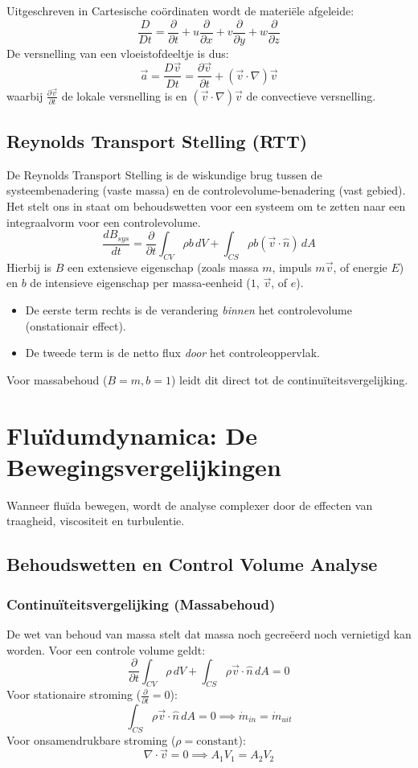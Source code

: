 \documentclass[a4paper,11pt,twoside]{report}
\begin{document}
Uitgeschreven in Cartesische coördinaten wordt de materiële afgeleide:
\[
\frac{D}{Dt} = \frac{\partial}{\partial t} + u \frac{\partial}{\partial x} + v \frac{\partial}{\partial y} + w \frac{\partial}{\partial z}
\]
De versnelling van een vloeistofdeeltje is dus:
\[
\vec{a} = \frac{D\vec{v}}{Dt} = \frac{\partial \vec{v}}{\partial t} + (\vec{v} \cdot \nabla)\vec{v}
\]
waarbij $\frac{\partial \vec{v}}{\partial t}$ de lokale versnelling is en $(\vec{v} \cdot \nabla)\vec{v}$ de convectieve versnelling.

\section{Reynolds Transport Stelling (RTT)}
De Reynolds Transport Stelling is de wiskundige brug tussen de systeembenadering (vaste massa) en de controlevolume-benadering (vast gebied). Het stelt ons in staat om behoudswetten voor een systeem om te zetten naar een integraalvorm voor een controlevolume.
\[
\frac{dB_{sys}}{dt} = \frac{\partial}{\partial t} \int_{CV} \rho b \, dV + \int_{CS} \rho b (\vec{v} \cdot \hat{n}) \, dA
\]
Hierbij is $B$ een extensieve eigenschap (zoals massa $m$, impuls $m\vec{v}$, of energie $E$) en $b$ de intensieve eigenschap per massa-eenheid ($1$, $\vec{v}$, of $e$).
\begin{itemize}
    \item De eerste term rechts is de verandering \textit{binnen} het controlevolume (onstationair effect).
    \item De tweede term is de netto flux \textit{door} het controleoppervlak.
\end{itemize}
Voor massabehoud ($B=m, b=1$) leidt dit direct tot de continuïteitsvergelijking.

\chapter{Fluïdumdynamica: De Bewegingsvergelijkingen}
Wanneer fluïda bewegen, wordt de analyse complexer door de effecten van traagheid, viscositeit en turbulentie.

\section{Behoudswetten en Control Volume Analyse}
\subsection{Continuïteitsvergelijking (Massabehoud)}
De wet van behoud van massa stelt dat massa noch gecreëerd noch vernietigd kan worden. Voor een controle volume geldt:
\[
\frac{\partial}{\partial t} \int_{CV} \rho \, dV + \int_{CS} \rho \vec{v} \cdot \hat{n} \, dA = 0
\]
Voor stationaire stroming ($\frac{\partial}{\partial t} = 0$):
\[
\int_{CS} \rho \vec{v} \cdot \hat{n} \, dA = 0 \implies \dot{m}_{in} = \dot{m}_{uit}
\]
Voor onsamendrukbare stroming ($\rho = \text{constant}$):
\[
\nabla \cdot \vec{v} = 0 \implies A_1 V_1 = A_2 V_2
\]
\end{document}
